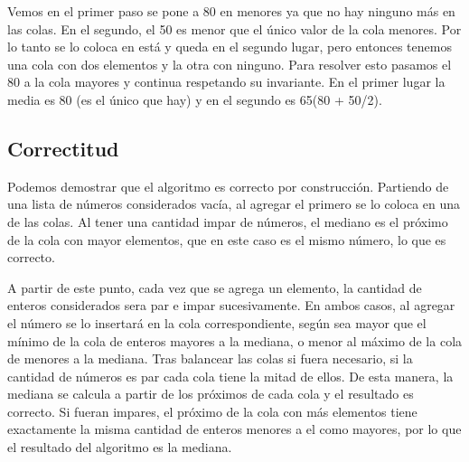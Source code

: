 \newpage

Vemos en el primer paso se pone a 80 en menores ya que no hay ninguno más en las colas. En el segundo, el 50 es menor que el único valor de la cola menores. 
Por lo tanto se lo coloca en está y queda en el segundo lugar, pero entonces tenemos una cola con dos elementos y la otra con ninguno. Para resolver esto pasamos el 80
a la cola mayores y continua respetando su invariante. En el primer lugar la media es 80 (es el único que hay) y en el segundo es 65(80 + 50/2).


\subsection{Correctitud}


Podemos demostrar que el algoritmo es correcto por construcción.
Partiendo de una lista de números considerados vacía, al agregar el primero se lo coloca en una de las colas. Al tener una cantidad impar de números, el mediano es el próximo de la cola con mayor elementos, que en este caso es el mismo número, lo que es correcto. 

A partir de este punto, cada vez que se agrega un elemento, la cantidad de enteros considerados sera par e impar sucesivamente.
 En ambos casos, al agregar el número se lo insertará en la cola correspondiente, según sea mayor que el mínimo de la cola de enteros mayores a la mediana, o menor al máximo de la cola de menores a la mediana. 
Tras balancear las colas si fuera necesario, si la cantidad de números es par cada cola tiene la mitad de ellos. De esta manera, la mediana se calcula a partir de los próximos de cada cola y el resultado es correcto.
 Si fueran impares, el próximo de la cola con más elementos tiene exactamente la misma cantidad de enteros menores a el como mayores, por lo que el resultado del algoritmo es la mediana.

